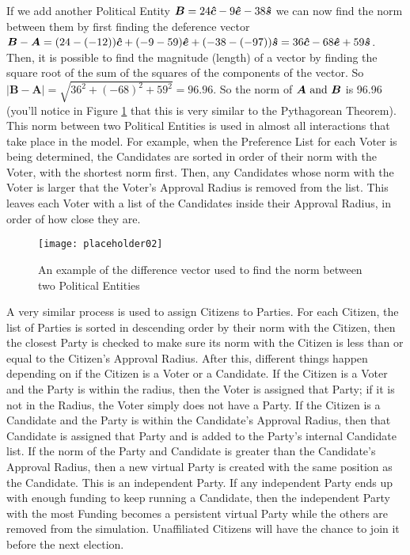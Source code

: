 \documentclass[12pt]{article}
\newcommand{\civ}{\vhat{c}}
\newcommand{\econ}{\vhat{e}}
\newcommand{\soc}{\vhat{s}}
\begin{document}
\qquad If we add another Political Entity $\bm{B} = 24\civ - 9\econ - 38\soc$ we can now find the norm between them by first finding the deference vector $\bm{B} - \bm{A} = (24 - (- 12))\civ + (-9 - 59)\econ + (-38 - (- 97))\soc = 36\civ - 68\econ + 59\soc$. Then, it is possible to find the magnitude (length) of a vector by finding the square root of the sum of the squares of the components of the vector. So $|\bm{B} - \bm{A}| = \sqrt{36^2 + (-68)^2 + 59^2} = 96.96$. So the norm of $\bm{A} \hbox{ and } \bm{B}$ is 96.96 (you'll notice in Figure \ref{exNorm} that this is very similar to the Pythagorean Theorem). This norm between two Political Entities is used in almost all interactions that take place in the model. For example, when the Preference List for each Voter is being determined, the Candidates are sorted in order of their norm with the Voter, with the shortest norm first. Then, any Candidates whose norm with the Voter is larger that the Voter's Approval Radius is removed from the list. This leaves each Voter with a list of the Candidates inside their Approval Radius, in order of how close they are.
\begin{figure}[H]
\centering
\texttt{[image: placeholder02]}
\caption{\footnotesize An example of the difference vector used to find the norm between two Political Entities}
\label{exNorm}
\end{figure}

\qquad A very similar process is used to assign Citizens to Parties. For each Citizen, the list of Parties is sorted in descending order by their norm with the Citizen, then the closest Party is checked to make sure its norm with the Citizen is less than or equal to the Citizen's Approval Radius. After this, different things happen depending on if the Citizen is a Voter or a Candidate. If the Citizen is a Voter and the Party is within the radius, then the Voter is assigned that Party; if it is not in the Radius, the Voter simply does not have a Party. If the Citizen is a Candidate and the Party is within the Candidate's Approval Radius, then that Candidate is assigned that Party and is added to the Party's internal Candidate list. If the norm of the Party and Candidate is greater than the Candidate's Approval Radius, then a new virtual Party is created with the same position as the Candidate. This is an independent Party. If any independent Party ends up with enough funding to keep running a Candidate, then the independent Party with the most Funding becomes a persistent virtual Party while the others are removed from the simulation. Unaffiliated Citizens will have the chance to join it before the next election. \\
\end{document}
